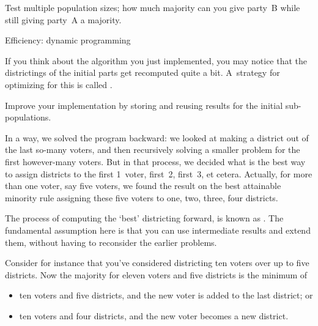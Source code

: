 \begin{exercise}
  Test multiple population sizes; how much majority can you give
  party~B while still giving party~A a majority.
\end{exercise}

 {Efficiency: dynamic programming}

If you think about the algorithm you just implemented, you may notice
that the districtings of the initial parts get recomputed quite a bit.
A~strategy for optimizing for this is called .

\begin{exercise}
  Improve your implementation by storing and reusing results for the
  initial sub-populations.
\end{exercise}

In a way, we solved the program backward: we looked at making a
district out of the last so-many voters, and then recursively solving
a smaller problem for the first however-many voters. But in that
process, we decided what is the best way to assign districts to the
first 1~voter, first~2, first~3, et cetera. Actually, for more than
one voter, say five voters, we found the result on the best attainable
minority rule assigning these five voters to one, two, three, four
districts.

The process of computing the `best' districting forward, is known as
. The fundamental assumption here
is that you can use intermediate results and extend them, without
having to reconsider the earlier problems.

Consider for instance that you've considered districting ten voters over up to
five districts. Now the majority for eleven voters and five districts
is the minimum of
\begin{itemize}
\item ten voters and five districts, and the new voter is added to the
  last district; or
\item ten voters and four districts, and the new voter becomes a new district.
\end{itemize}

